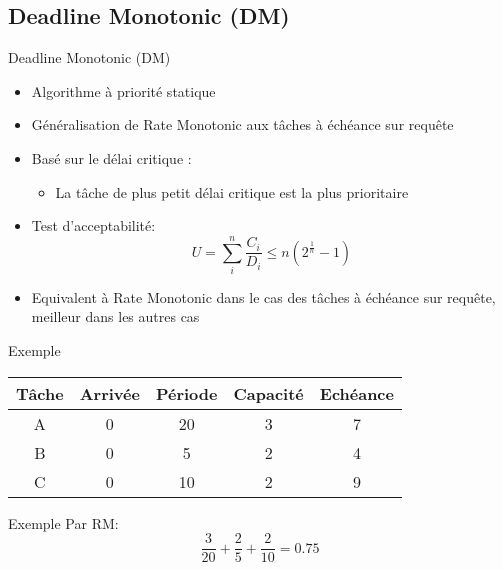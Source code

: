 \subsection{Deadline Monotonic (DM)}

\begin{frame}{Deadline Monotonic (DM)} 
  \begin{itemize}
  \item Algorithme à priorité statique
\item Généralisation de Rate Monotonic aux tâches à échéance sur requête
  \item Basé sur le délai critique :
    \begin{itemize}
    \item La tâche de plus petit délai critique est la plus prioritaire
    \end{itemize}
\item Test d'acceptabilité:
  $$U = \sum_i^n \frac{C_i}{D_i} ≤ n \left(2^{\frac{1}{n}}-1\right)$$
  \item Equivalent à Rate Monotonic  dans le cas des tâches à échéance
    sur requête, meilleur dans les autres cas
  \end{itemize}
\end{frame}

\begin{frame}{Exemple}
  \begin{center}
    \begin{tabular}{ccccc}
      \hline
      Tâche & Arrivée & Période & Capacité & Echéance \\
      \hline
      A & 0 & 20 & 3 & 7\\
      B & 0 &  5 & 2 & 4\\
      C & 0 & 10 & 2 & 9\\
      \hline
    \end{tabular}
  \end{center}
\end{frame} 

\begin{frame}{Exemple}
  Par RM:
  $$\frac{3}{20} + \frac{2}{5} + \frac{2}{10} = 0.75$$
\end{frame}


